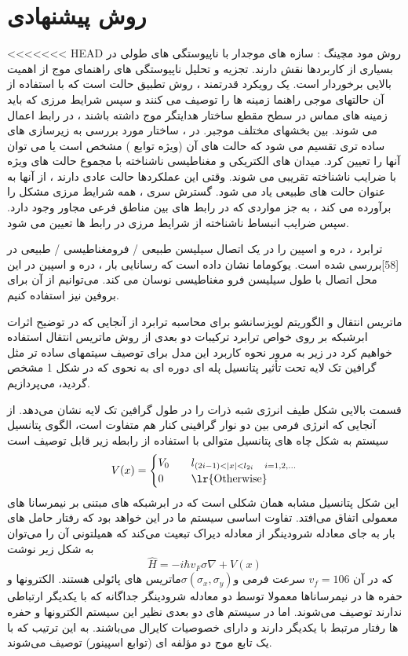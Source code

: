 \chapter{روش پیشنهادی}
\clearpage
<<<<<<< HEAD
روش مود مچینگ :
سازه های موجدار با ناپیوستگی های طولی در بسیاری از کاربردها نقش دارند. تجزیه و تحلیل ناپیوستگی های راهنمای موج از اهمیت بالایی برخوردار است. یک رویکرد قدرتمند ، روش تطبیق حالت  است که با استفاده از آن حالتهای موجی راهنما زمینه ها را توصیف می کنند و سپس شرایط مرزی که باید زمینه های مماس در سطح مقطع ساختار هدایتگر موج داشته باشند ، در رابط اعمال می شوند. بین بخشهای مختلف موجبر. در  ، ساختار مورد بررسی به زیرسازی های ساده تری تقسیم می شود که حالت های آن (ویژه توابع ) مشخص است یا می توان آنها را تعیین کرد. میدان های الکتریکی و مغناطیسی ناشناخته با مجموع حالت های ویژه با ضرایب ناشناخته تقریبی می شوند. وقتی این عملکردها حالت عادی دارند ، از آنها به عنوان حالت های طبیعی یاد می شود. گسترش سری ، همه شرایط مرزی مشکل را برآورده می کند ، به جز مواردی که در رابط های بین مناطق فرعی مجاور وجود دارد. سپس ضرایب انبساط ناشناخته از شرایط مرزی در رابط ها تعیین می شود.

ترابرد ، دره و اسپین را در یک اتصال سیلیسن طبیعی / فرومغناطیسی / طبیعی در [58]بررسی شده است. یوکوماما نشان داده است که رسانایی بار ، دره و اسپین در این محل اتصال با طول سیلیسن فرو مغناطیسی نوسان می کند. می‌توانیم از آن برای بروفین نیز استفاده کنیم.

ماتریس انتقال و الگوریتم لوپزسانشو برای محاسبه ترابرد
از آنجایی که در توضیح اثرات ابرشبکه بر روی خواص ترابرد ترکیبات دو بعدی از روش ماتریس انتقال استفاده خواهیم کرد در زیر به مرور نحوه کاربرد این مدل برای توصیف سیتمهای ساده تر مثل گرافین تک لایه تحت تأثیر پتانسیل پله ای دوره ای به نحوی که در شکل 1 مشخص گردید، می‌پردازیم.

قسمت بالایی شکل طیف انرژی شبه ذرات را در طول گرافین تک لایه نشان می‌دهد. از آنجایی که انرژی فرمی بین دو نوار گرافینی کنار هم متفاوت است، الگوی پتانسیل سیستم به شکل چاه های پتانسیل متوالی با استفاده از رابطه زیر قابل توصیف است
$$
V(x) = \begin{cases}
    V_0 &\quad l_{(2i-1)< |x| < l_{2i}\quad i=1,2,\dots}\\
    0 &\quad\text{\lr{Otherwise}}
\end{cases}
$$
این شکل پتانسیل مشابه همان شکلی است که در ابرشبکه های مبتنی بر نیمرسانا های معمولی اتفاق می‌افتد. تفاوت اساسی سیستم ما در این خواهد بود که رفتار حامل های بار به جای معادله شرودینگر از معادله دیراک تبعیت می‌کند که همیلتونی آن را می‌توان به شکل زیر نوشت
$$
\hat{H} = -i\hbar v_F\sigma \nabla + V(x)
$$
که در آن $v_f = 106$  سرعت فرمی و$\sigma(\sigma_x,\sigma_y)$ماتریس های پائولی هستند. الکترونها و حفره ها در نیمرساناها معمولا توسط دو معادله شرودینگر جداگانه که با یکدیگر ارتباطی ندارند توصیف می‌شوند. اما در سیستم های دو بعدی نظیر این سیستم الکترونها و حفره ها رفتار مرتبط با یکدیگر دارند و دارای خصوصیات کایرال می‌باشند. به این ترتیب که با یک تابع موج دو مؤلفه ای (توابع اسپینور) توصیف می‌شوند.

